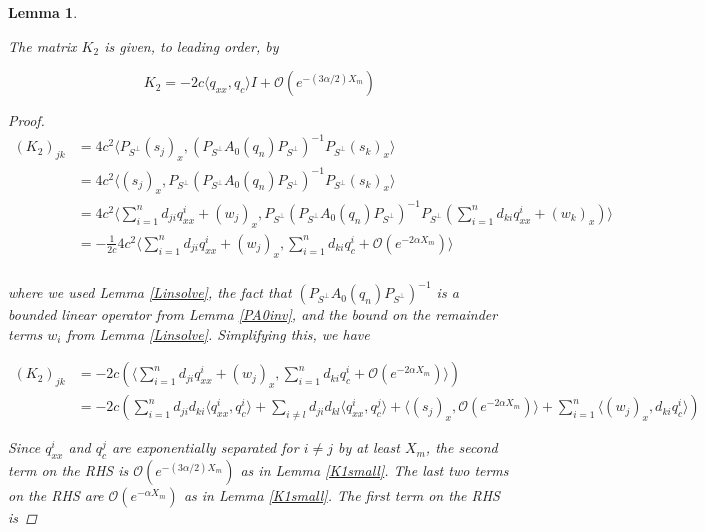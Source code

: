 \documentclass[12pt]{article}
\newtheorem{lemma}{Lemma}
\begin{document}
\begin{lemma}\label{K2exp}

The matrix $K_2$ is given, to leading order, by

\begin{equation}
K_2 = -2c \langle q_{xx}, q_c \rangle I + \mathcal{O}(e^{-(3 \alpha/2) X_m})
\end{equation}

\begin{proof}

\begin{align*}
(K_2)_{jk} 
&= 4 c^2 \langle P_{S^\perp} (s_j)_{x}, (P_{S^\perp} A_0(q_n) P_{S^\perp})^{-1} P_{S^\perp} (s_k)_{x} \rangle \\
&= 4 c^2 \langle (s_j)_{x}, P_{S^\perp}(P_{S^\perp} A_0(q_n) P_{S^\perp})^{-1} P_{S^\perp} (s_k)_{x} \rangle \\
&= 4 c^2 \langle \sum_{i = 1}^{n} d_{ji} q^i_{xx} + (w_j)_x, P_{S^\perp} (P_{S^\perp} A_0(q_n) P_{S^\perp})^{-1} P_{S^\perp} \left( \sum_{i = 1}^{n} d_{ki} q^i_{xx} + (w_k)_x \right) \rangle \\
&= -\frac{1}{2 c} 4 c^2 
\langle \sum_{i = 1}^{n} d_{ji} q^i_{xx} + (w_j)_x, \sum_{i = 1}^{n} d_{ki} q^i_c + \mathcal{O}(e^{-2 \alpha X_m}) \rangle \\
\end{align*}

where we used Lemma \ref{Linsolve}, the fact that $(P_{S^\perp} A_0(q_n) P_{S^\perp})^{-1}$ is a bounded linear operator from Lemma \ref{PA0inv}, and the bound on the remainder terms $w_i$ from Lemma \ref{Linsolve}. Simplifying this, we have

\begin{align*}
(K_2)_{jk} &= -2 c \left( 
\langle \sum_{i = 1}^{n} d_{ji} q^i_{xx} + (w_j)_x, \sum_{i = 1}^{n} d_{ki} q^i_c + \mathcal{O}(e^{-2 \alpha X_m}) \rangle \right) \\
&= -2 c \left( \sum_{i = 1}^{n} d_{ji} d_{ki} \langle q^i_{xx}, q^i_c \rangle
+ \sum_{i\neq l} d_{ji} d_{kl} \langle q^i_{xx}, q^j_c \rangle
+ \langle (s_j)_x,  \mathcal{O}(e^{-2 \alpha X_m}) \rangle 
+ \sum_{i=1}^n \langle (w_j)_x, d_{ki} q^i_c \rangle \right)
\end{align*}

Since $q^i_{xx}$ and $q^j_c$ are exponentially separated for $i \neq j$ by at least $X_m$, the second term on the RHS is $\mathcal{O}(e^{-(3 \alpha/2) X_m})$ as in Lemma \ref{K1small}. The last two terms on the RHS are $\mathcal{O}(e^{-\alpha X_m})$ as in Lemma \ref{K1small}. The first term on the RHS is


\end{proof}
\end{lemma}
\end{document}
